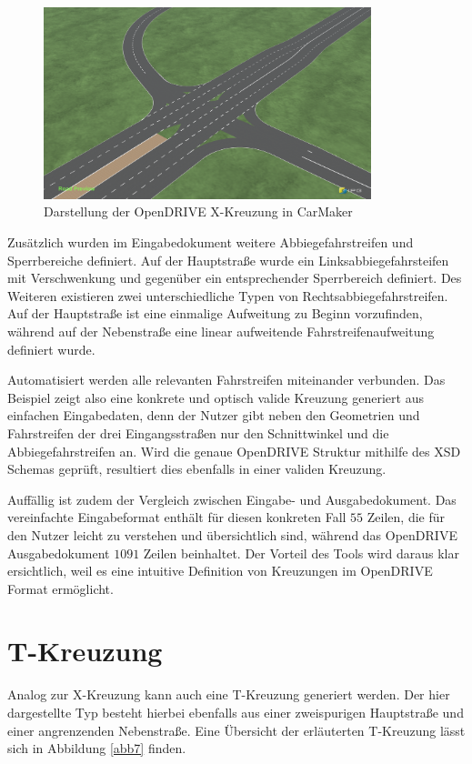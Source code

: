 \begin{figure}[!h]
\flushleft
\center \includegraphics[width=0.85\textwidth]{fig/junction4.png}
\caption{Darstellung der OpenDRIVE X-Kreuzung in CarMaker}
\label{abb6}
\end{figure}

Zusätzlich wurden im Eingabedokument weitere Abbiegefahrstreifen und Sperrbereiche definiert. Auf der Hauptstraße wurde ein Linksabbiegefahrsteifen mit Verschwenkung und gegenüber ein entsprechender Sperrbereich definiert. Des Weiteren existieren zwei unterschiedliche Typen von Rechtsabbiegefahrstreifen. Auf der Hauptstraße ist eine einmalige Aufweitung zu Beginn vorzufinden, während auf der Nebenstraße eine linear aufweitende Fahrstreifenaufweitung definiert wurde.

Automatisiert werden alle relevanten Fahrstreifen miteinander verbunden. Das Beispiel zeigt also eine konkrete und optisch valide Kreuzung generiert aus einfachen Eingabedaten, denn der Nutzer gibt neben den Geometrien und Fahrstreifen der drei Eingangsstraßen nur den Schnittwinkel und die Abbiegefahrstreifen an. Wird die genaue OpenDRIVE Struktur mithilfe des XSD Schemas geprüft, resultiert dies ebenfalls in einer validen Kreuzung.

Auffällig ist zudem der Vergleich zwischen Eingabe- und Ausgabedokument. Das vereinfachte Eingabeformat enthält für diesen konkreten Fall \(55\) Zeilen, die für den Nutzer leicht zu verstehen und übersichtlich sind, während das OpenDRIVE Ausgabedokument \(1091\) Zeilen beinhaltet. Der Vorteil des Tools wird daraus klar ersichtlich, weil es eine intuitive Definition von Kreuzungen im OpenDRIVE Format ermöglicht.

\section{T-Kreuzung}
Analog zur X-Kreuzung kann auch eine T-Kreuzung generiert werden. Der hier dargestellte Typ besteht hierbei ebenfalls aus einer zweispurigen Hauptstraße und einer angrenzenden Nebenstraße. Eine Übersicht der erläuterten T-Kreuzung lässt sich in Abbildung \ref{abb7} finden.

